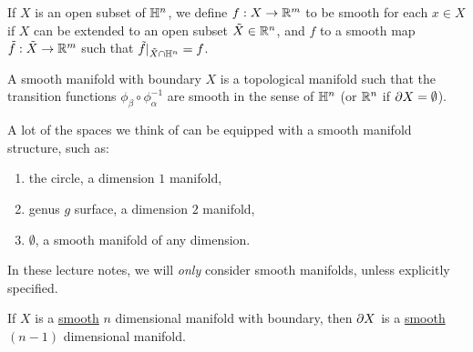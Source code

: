 \begin{defn}\label{SmoothHalf}
    If $X$ is an open subset of $\mathbb{H}^n$, we define $f:X\to\mathbb{R}^m$ to be smooth for each $x\in X$ if $X$ can be extended to an open subset $\tilde{X}\in\mathbb{R}^n$, and $f$ to a smooth map $\tilde{f}:\tilde{X}\to\mathbb{R}^m$ such that $\tilde{f}|_{\tilde{X}\cap\mathbb{H}^n}=f$. 
\end{defn}

\begin{defn}
    A smooth manifold with boundary $X$ is a topological manifold such that the transition functions $\phi_\beta\circ\phi^{-1}_\alpha$ are smooth in the sense of $\mathbb{H}^n$ (or $\mathbb{R}^n$ if $\partial X=\emptyset$).
\end{defn}

\begin{ex}
    A lot of the spaces we think of can be equipped with a smooth manifold structure, such as:
    \begin{enumerate}
        \item the circle, a dimension $1$ manifold,
        \item genus $g$ surface, a dimension $2$ manifold,
        \item $\emptyset$, a smooth manifold of any dimension.
    \end{enumerate}
\end{ex}
\begin{notat}
    In these lecture notes, we will \textit{only} consider smooth manifolds, unless explicitly specified.
\end{notat}

\begin{cor}
    If $X$ is a \underline{smooth} $n$ dimensional manifold with boundary, then $\partial X$ is a \underline{smooth} $(n-1)$ dimensional manifold.
\end{cor}
     
